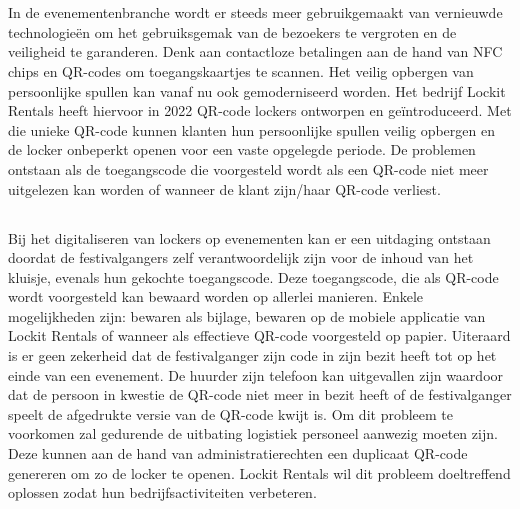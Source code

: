 
\chapter{}%
\label{ch:inleiding}

In de evenementenbranche wordt er steeds meer gebruikgemaakt van vernieuwde technologieën om het gebruiksgemak van de bezoekers te vergroten en de veiligheid te garanderen. Denk aan contactloze betalingen aan de hand van NFC chips en QR-codes om toegangskaartjes te scannen. Het veilig opbergen van persoonlijke spullen kan vanaf nu ook gemoderniseerd worden. Het bedrijf Lockit Rentals heeft hiervoor in 2022 QR-code lockers ontworpen en geïntroduceerd. Met die unieke QR-code kunnen klanten hun persoonlijke spullen veilig opbergen en de locker onbeperkt openen voor een vaste opgelegde periode. De problemen ontstaan als de toegangscode die voorgesteld wordt als een QR-code niet meer uitgelezen kan worden of wanneer de klant zijn/haar QR-code verliest. 

\newpage

\section{}%
\label{sec:probleemstelling}

Bij het digitaliseren van lockers op evenementen kan er een uitdaging ontstaan doordat de festivalgangers zelf verantwoordelijk zijn voor de inhoud van het kluisje, evenals hun gekochte toegangscode. Deze toegangscode, die als QR-code wordt voorgesteld kan bewaard worden op allerlei manieren. Enkele mogelijkheden zijn: bewaren als bijlage, bewaren op de mobiele applicatie van Lockit Rentals of wanneer als effectieve QR-code voorgesteld op papier. Uiteraard is er geen zekerheid dat de festivalganger zijn code in zijn bezit heeft tot op het einde van een evenement. De huurder zijn telefoon kan uitgevallen zijn waardoor dat de persoon in kwestie de QR-code niet meer in bezit heeft of de festivalganger speelt de afgedrukte versie van de QR-code kwijt is. Om dit probleem te voorkomen zal gedurende de uitbating logistiek personeel aanwezig moeten zijn. Deze kunnen aan de hand van administratierechten een duplicaat QR-code genereren om zo de locker te openen. Lockit Rentals wil dit probleem doeltreffend oplossen zodat hun bedrijfsactiviteiten verbeteren. \newline 

